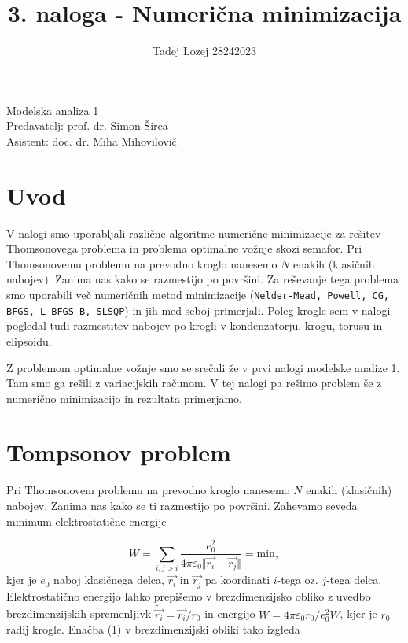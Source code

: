 \documentclass[slovene,11pt,a4paper]{article}
\begin{document}
\title{3. naloga - Numerična minimizacija}
\author{Tadej Lozej 28242023}
\maketitle
\begin{center}
Modelska analiza 1 \\
\bigskip
Predavatelj: prof. dr. Simon Širca \\
Asistent: doc. dr. Miha Mihovilovič
\end{center}

\newpage

\tableofcontents

\newpage

\section{Uvod}


V nalogi smo uporabljali različne algoritme numerične minimizacije za rešitev Thomsonovega problema in problema optimalne vožnje skozi semafor. Pri Thomsonovemu problemu na prevodno kroglo nanesemo $N$ enakih (klasičnih nabojev). Zanima nas kako se razmestijo po površini. Za reševanje tega problema smo uporabili več numeričnih metod minimizacije (\texttt{Nelder-Mead, Powell, CG, BFGS, L-BFGS-B, SLSQP}) in jih med seboj primerjali. Poleg krogle sem v nalogi pogledal tudi razmestitev nabojev po krogli v kondenzatorju, krogu, torusu in elipsoidu.

Z problemom optimalne vožnje smo se srečali že v prvi nalogi modelske analize 1. Tam smo ga rešili z variacijskih računom. V tej nalogi pa rešimo problem še z numerično minimizacijo in rezultata primerjamo.

\section{Tompsonov problem}

Pri Thomsonovem problemu na prevodno kroglo nanesemo $N$ enakih (klasičnih) nabojev. Zanima nas kako se ti razmestijo po površini. Zahevamo seveda minimum elektrostatične energije

\begin{equation}
W = \sum_{i, j>i} \frac{e_0^2}{4\pi\varepsilon_0 \Vert \vec{r_i}-\vec{r_j} \Vert} = \text{min},
\end{equation}
kjer je $e_0$ naboj klasičnega delca, $\vec{r_i}$ in $\vec{r_j}$ pa koordinati $i$-tega oz. $j$-tega delca. Elektrostatično energijo lahko prepišemo v brezdimenzijsko obliko z uvedbo brezdimenzijskih spremenljivk $\tilde{\vec{r_i}} = \vec{r_i}/r_0$ in energijo $\tilde{W} = 4\pi \varepsilon_0 r_0 / e_0^2 W$, kjer je $r_0$ radij krogle. Enačba (1) v brezdimenzijski obliki tako izgleda
\end{document}
